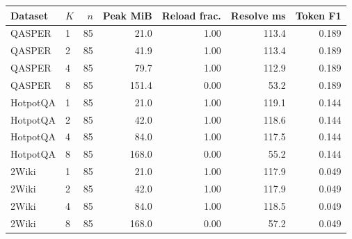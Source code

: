 \begin{tabular}{llrrrrr}
\toprule
Dataset & $K$ & $n$ & Peak MiB & Reload frac. & Resolve ms & Token F1 \\
\midrule
QASPER & 1 & 85 & 21.0 & 1.00 & 113.4 & 0.189 \\
QASPER & 2 & 85 & 41.9 & 1.00 & 113.4 & 0.189 \\
QASPER & 4 & 85 & 79.7 & 1.00 & 112.9 & 0.189 \\
QASPER & 8 & 85 & 151.4 & 0.00 & 53.2 & 0.189 \\
HotpotQA & 1 & 85 & 21.0 & 1.00 & 119.1 & 0.144 \\
HotpotQA & 2 & 85 & 42.0 & 1.00 & 118.6 & 0.144 \\
HotpotQA & 4 & 85 & 84.0 & 1.00 & 117.5 & 0.144 \\
HotpotQA & 8 & 85 & 168.0 & 0.00 & 55.2 & 0.144 \\
2Wiki & 1 & 85 & 21.0 & 1.00 & 117.9 & 0.049 \\
2Wiki & 2 & 85 & 42.0 & 1.00 & 117.9 & 0.049 \\
2Wiki & 4 & 85 & 84.0 & 1.00 & 118.5 & 0.049 \\
2Wiki & 8 & 85 & 168.0 & 0.00 & 57.2 & 0.049 \\
\bottomrule
\end{tabular}
